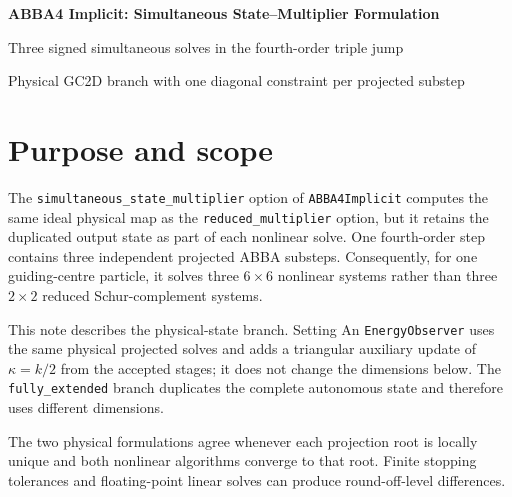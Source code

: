 \documentclass[11pt,a4paper]{article}
\begin{document}
\begin{center}
\end{center}


\begin{center}
  {\LARGE\bfseries\color{blue}ABBA4 Implicit: Simultaneous State--Multiplier Formulation}\par
  \vspace{0.35em}
  {\large Three signed simultaneous solves in the fourth-order triple jump}\par
  \vspace{0.45em}
  {\small Physical GC2D branch with one diagonal constraint per projected substep}
\end{center}

\vspace{0.5em}

\section{Purpose and scope}

The \texttt{simultaneous\_state\_multiplier} option of
\texttt{ABBA4Implicit} computes the same ideal physical map as the
\texttt{reduced\_multiplier} option, but it retains the duplicated output state
as part of each nonlinear solve.  One fourth-order step contains three
independent projected ABBA substeps.  Consequently, for one guiding-centre
particle, it solves three $6\times6$ nonlinear systems rather than three
$2\times2$ reduced Schur-complement systems.

This note describes the physical-state branch.  Setting
An \texttt{EnergyObserver} uses the same physical projected solves and adds a
triangular auxiliary update of $\kappa=k/2$ from the accepted stages; it does
not change the dimensions below.  The \texttt{fully\_extended} branch
duplicates the complete autonomous state and therefore uses different
dimensions.

The two physical formulations agree whenever each projection root is locally
unique and both nonlinear algorithms converge to that root.  Finite stopping
tolerances and floating-point linear solves can produce round-off-level
differences.
\end{document}
